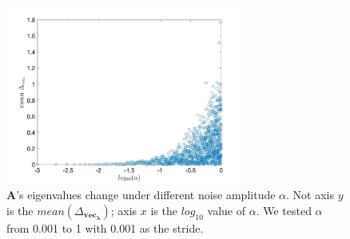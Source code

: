\documentclass[a4paper,fleqn]{article}
\begin{document}
    \begin{figure}[!ht]
        \centering
        \includegraphics[width=0.7\textwidth]{diff_alpha.jpg}
        \caption{$\mathbf{A}$'s eigenvalues change under different noise amplitude $\alpha$. Not axis $y$ is the $mean(\Delta_{\mathbf{vec_\lambda}})$; axis $x$ is the $log_{10}$ value of $\alpha$. We tested $\alpha$ from 0.001 to 1 with 0.001 as the stride.}
    \end{figure}
\end{document}
